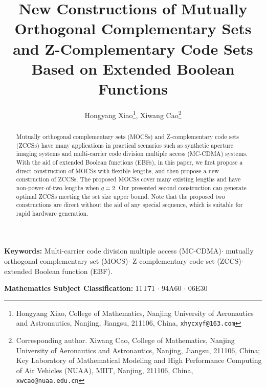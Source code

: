 \documentclass[11pt]{article}
\newcommand{\2} {$2$-to-$1$}
\begin{document}
\title{\bf New Constructions of Mutually Orthogonal Complementary Sets and Z-Complementary Code Sets Based on Extended Boolean Functions}
\author{Hongyang Xiao\thanks{ Hongyang Xiao, College of Mathematics, Nanjing University of Aeronautics and Astronautics, Nanjing, Jiangsu, 211106, China, {\tt xhycxyf@163.com}},
Xiwang Cao\thanks{Corresponding author. Xiwang Cao, College of Mathematics, Nanjing University of Aeronautics and Astronautics, Nanjing, Jiangsu, 211106, China; Key Laboratory of Mathematical Modeling and High Performance Computing of Air Vehicles (NUAA), MIIT, Nanjing, 211106, China, {\tt xwcao@nuaa.edu.cn}}
}
\date{}
\maketitle

\begin{abstract}
Mutually orthogonal complementary sets (MOCSs) and  Z-complementary code sets (ZCCSs) have many applications in practical scenarios such as synthetic aperture imaging systems and multi-carrier code division multiple access (MC-CDMA) systems.  With the aid of extended Boolean functions (EBFs), in this paper, we first propose a direct construction of MOCSs with flexible lengths, and then propose a new construction of ZCCSs. The proposed MOCSs cover many existing lengths and have non-power-of-two lengths when $q=2$. Our presented second construction can generate optimal ZCCSs meeting the set size upper bound. Note that the proposed two constructions are direct without the aid of any special sequence, which is suitable for rapid hardware generation.

\end{abstract}

{\bf Keywords:}   Multi-carrier code division multiple access (MC-CDMA)$ \cdot $ mutually orthogonal complementary set (MOCS)$ \cdot $ Z-complementary code set (ZCCS)$ \cdot $ extended Boolean function (EBF).

{\bf Mathematics Subject Classification:}  11T71 $\cdot$ 94A60 $ \cdot $ 06E30
\end{document}
